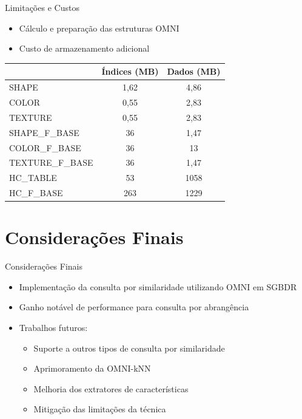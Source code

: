 \documentclass{beamer}
\begin{document}
\begin{frame}{Limitações e Custos}
 \begin{itemize}
  \item Cálculo e preparação das estruturas OMNI\newline
  \item Custo de armazenamento adicional
 \end{itemize}
\begin{table}[H]
    \centering
   \begin{tabular}{l c c}
             &Índices (MB)& Dados (MB)\\ \hline
            SHAPE & 1,62& 4,86 \\
            COLOR & 0,55& 2,83 \\
            TEXTURE & 0,55& 2,83 \\
            SHAPE\_F\_BASE & 36& 1,47 \\
            COLOR\_F\_BASE & 36& 13 \\
            TEXTURE\_F\_BASE & 36& 1,47 \\ \hline \hline
	    HC\_TABLE & 53& 1058 \\
            HC\_F\_BASE & 263& 1229 \\ \hline 
    \end{tabular}
\end{table}
\end{frame}



\section{Considerações Finais}

\begin{frame}{Considerações Finais}
  \begin{itemize}

   \item Implementação da consulta por similaridade utilizando OMNI em SGBDR\newline
   \item Ganho notável de performance para consulta por abrangência\newline
   \item Trabalhos futuros: \newline
   \begin{itemize}
      \item Suporte a outros tipos de consulta por similaridade\newline
      \item Aprimoramento da OMNI-kNN\newline
      \item Melhoria dos extratores de características\newline
      \item Mitigação das limitações da técnica\newline
   \end{itemize}
  \end{itemize}
\end{frame}
\end{document}
